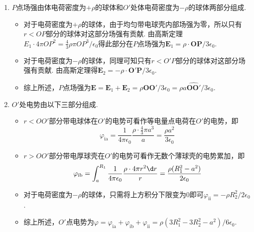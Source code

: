 \begin{solution}\leavevmode
    \begin{enumerate}
        \item $P$点场强由体电荷密度为$+\rho$的球体和$O'$处体电荷密度为$-\rho$的球体两部分组成.
        \begin{itemize}
            \item 对于电荷密度为$+\rho$的球体，由于均匀带电球壳内部场强为零，所以只有$r<OP$部分的球体对这部分场强有贡献. 由高斯定理$E_1\cdot 4\pi OP^2=\frac43\rho\pi OP^3/\epsilon_0$得此部分在$P$点场强为$\bm E_1=\rho\cdot\bm{OP}/3\epsilon_0$.
            \item 对于电荷密度为$-\rho$的球体，同理可知只有$r<O'P$部分的球体对这部分场强有贡献. 由高斯定理得$\bm E_2=-\rho\cdot\bm{O'P}/3\epsilon_0$.
            \item 综上所述，$P$点场强为$\bm E=\bm E_1+\bm E_2=\rho\bm{OO'}/3\epsilon_0=\rho a\widehat{\bm{OO'}}/3\epsilon_0$.
        \end{itemize}
        \addtocounter{enumi}{1}
        \item $O'$处电势由以下三部分组成.
        \begin{itemize}
            \item $r<OO'$部分带电球体在$O'$的电势可看作等电量点电荷在$O'$的电势，即
            \[\varphi_\text{ia}=\frac{1}{4\pi\epsilon_0}\frac{\rho\cdot\frac{4}{3}\pi a^3}{a}=\frac{\rho a^2}{3\epsilon_0}\]
            \item $r>OO'$部分带电厚球壳在$O'$的电势可看作无数个薄球壳的电势累加，即
            \[\varphi_\text{ib}=\int_a^{R_1}{\frac{1}{4\pi\epsilon_0}\frac{\rho\cdot 4\pi r^2\d r}{r}}=\frac{\rho(R_1^2-a^2)}{2\epsilon_0}\]
            \item 对于电荷密度为$-\rho$的球体，只需将上方积分下限变为$0$即可$\varphi_\text{ii}=-\rho R_2^2/2\epsilon_0$.
            \item 综上所述，$O'$点电势为$\varphi=\varphi_\text{ia}+\varphi_\text{ib}+\varphi_\text{ii}=\rho(3R_1^2-3R_2^2-a^2)/6\epsilon_0$.
        \end{itemize}
    \end{enumerate}
\end{solution}

